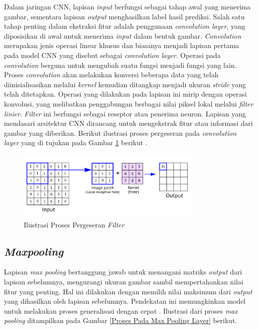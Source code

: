     Dalam jaringan CNN, lapisan \textit{input} berfungsi sebagai tahap awal yang menerima gambar, sementara lapisan \textit{output} menghasilkan label hasil prediksi. Salah satu tahap penting dalam ekstraksi fitur adalah penggunaan \textit{convolution layer}, yang diposisikan di awal untuk menerima \textit{input} dalam bentuk gambar. \textit{Convolution} merupakan jenis operasi linear khusus dan biasanya menjadi lapisan
    pertama pada model CNN yang disebut sebagai \textit{convolution layer}. Operasi pada
    \textit{convolution} berguna untuk mengubah suatu fungsi menjadi fungsi yang lain. Proses \textit{convolution} akan melakukan konversi
    beberapa data yang telah diinisialisasikan melalui \textit{kernel} kemudian ditangkap
    menjadi ukuran \textit{stride} yang telah ditetapkan.
    Operasi yang dilakukan pada lapisan ini mirip dengan operasi konvolusi, yang melibatkan penggabungan berbagai nilai piksel lokal melalui \textit{filter linier}. \textit{Filter} ini berfungsi sebagai reseptor atau penerima neuron. Lapisan yang mendasari arsitektur CNN dirancang untuk mengekstrak fitur atau informasi dari gambar yang diberikan. Berikut ilustrasi proses pergeseran pada \textit{convolution layer} yang di tujukan pada Gambar \ref{Ilustrasi Proses Pergeseran Filter Pada Convolutional Layer} berikut \cite{Dewi2018}.

  \begin{figure}[H]
      \centering
      \includegraphics[width=0.8\textwidth]{figures/bab2/cnn.png}
      \caption{Ilustrasi Proses Pergeseran \textit{Filter} \cite{Reynolds}}
      \label{Ilustrasi Proses Pergeseran Filter Pada Convolutional Layer}
    
 \end{figure}


\subsection{\textit{Maxpooling}}

    Lapisan \textit{max pooling} bertanggung jawab untuk menangani matriks \textit{output} dari lapisan sebelumnya, mengurangi ukuran gambar sambil mempertahankan nilai fitur yang penting. Hal ini dilakukan dengan memilih nilai maksimum dari \textit{output} yang dihasilkan oleh lapisan sebelumnya. Pendekatan ini memungkinkan model untuk melakukan proses generalisasi dengan cepat \cite{Gholamalinezhad2020, Nagi2011MaxpoolingCN}. Ilustrasi dari proses \textit{max pooling} ditampilkan pada Gambar \ref{Proses Pada Max Pooling Layer} berikut.


